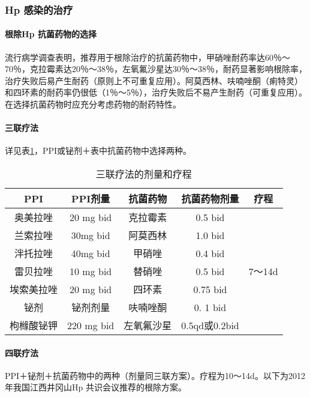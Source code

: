 \subsubsection{Hp 感染的治疗}
\paragraph{根除{Hp} 抗菌药物的选择}

流行病学调查表明，推荐用于根除治疗的抗菌药物中，甲硝唑耐药率达60％～70％，克拉霉素达20％～38％，左氧氟沙星达30％～38％，耐药显著影响根除率，治疗失败后易产生耐药（原则上不可重复应用）。阿莫西林、呋喃唑酮（痢特灵）和四环素的耐药率仍很低（1％～5％），治疗失败后不易产生耐药（可重复应用）。在选择抗菌药物时应充分考虑药物的耐药特性。
\paragraph{三联疗法}

详见表\ref{tab13-2}，PPI或铋剂＋表中抗菌药物中选择两种。

\begin{table}
    \centering
    \caption{三联疗法的剂量和疗程}
    \label{tab13-2}
    \begin{tabular}{ccccc}
        \toprule
        PPI        & PPI剂量    & 抗菌药物   & 抗菌药物剂量  & 疗程   \\
        \midrule
        奥美拉唑   & 20 mg bid  & 克拉霉素   & 0.5 bid       &        \\
        兰索拉唑   & 30mg bid   & 阿莫西林   & 1.0 bid       &        \\
        泮托拉唑   & 40mg bid   & 甲硝唑     & 0.4 bid       &        \\
        雷贝拉唑   & 10 mg bid  & 替硝唑     & 0.5 bid       & 7～14d \\
        埃索美拉唑 & 20 mg bid  & 四环素     & 0.75 bid      &        \\
        铋剂       & 铋剂剂量   & 呋喃唑酮   & 0. 1 bid      &        \\
        枸橼酸铋钾 & 220 mg bid & 左氧氟沙星 & 0.5qd或0.2bid &        \\
        \bottomrule
    \end{tabular}
\end{table}

\paragraph{四联疗法}

PPI＋铋剂＋抗菌药物中的两种（剂量同三联方案）。疗程为10～14d。以下为2012年我国江西井冈山{Hp}
共识会议推荐的根除方案。

